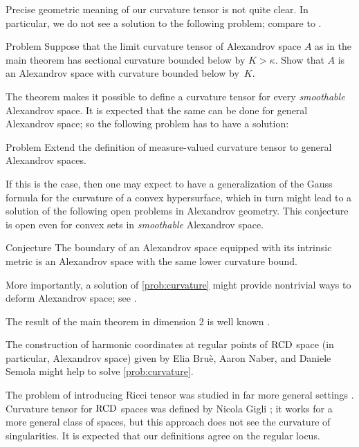 Precise geometric meaning of our curvature tensor is not quite clear. 
In particular, we do not see a solution to the following problem;
compare to \cite[Conjecture~1.1]{G}.

\begin{thm}{Problem}
Suppose that the limit curvature tensor of Alexandrov space $A$ as in the main theorem has sectional curvature bounded below by $K>\kappa$.
Show that $A$ is an Alexandrov space with curvature bounded below by~$K$.
\end{thm}

The theorem makes it possible to define a curvature tensor for every \emph{smoothable} Alexandrov space.
It is expected that the same can be done for general Alexandrov space; so the following problem has to have a solution:

\begin{thm}{Problem}\label{prob:curvature}
Extend the definition of measure-valued curvature tensor to general Alexandrov spaces.
\end{thm}

If this is the case, then one may expect to have a generalization of the Gauss formula for the curvature of a convex hypersurface, which in turn might lead to a solution of the following open problems in Alexandrov geometry.
This conjecture is open even for convex sets in \emph{smoothable} Alexandrov space.

\begin{thm}{Conjecture}
The boundary of an Alexandrov space equipped with its intrinsic metric is an Alexandrov space with the same lower curvature bound.
\end{thm}

More importantly, a solution of \ref{prob:curvature} might provide nontrivial ways to deform Alexandrov space; see \cite[Section 9]{petrunin-conc}. 

The result of the main theorem in dimension 2 is well known \cite[VII \S13]{AZ}.

The construction of harmonic coordinates at regular points of $\operatorname{RCD}$ space (in particular, Alexandrov space) given by Elia Bruè, Aaron Naber, and Daniele Semola \cite{BNS} might help to solve \ref{prob:curvature}.

The problem of introducing Ricci tensor
was studied in far more general settings \cite{G1,St,H,L}.
Curvature tensor for $\operatorname{RCD}$ spaces was defined by Nicola Gigli \cite{G};
it works for a more general class of spaces, but this approach does not see the curvature of singularities.
It is expected that our definitions agree on the regular locus.

